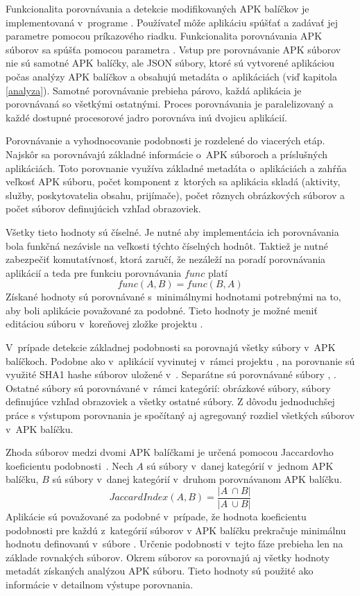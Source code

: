 Funkcionalita porovnávania a detekcie modifikovaných APK balíčkov je implementovaná v~programe . Používateľ môže aplikáciu spúšťať a zadávať jej parametre pomocou príkazového riadku. Funkcionalita porovnávania APK súborov sa spúšťa pomocou parametra . Vstup pre porovnávanie APK súborov nie sú samotné APK balíčky, ale JSON súbory, ktoré sú vytvorené aplikáciou  počas analýzy APK balíčkov a obsahujú metadáta o~aplikáciách (viď kapitola \ref{analyza}). Samotné porovnávanie prebieha párovo, každá aplikácia je porovnávaná so všetkými ostatnými. Proces porovnávania je paralelizovaný a každé dostupné procesorové jadro porovnáva inú dvojicu aplikácií. 

Porovnávanie a vyhodnocovanie podobnosti je rozdelené do viacerých etáp. Najskôr sa porovnávajú základné informácie o~APK súboroch a príslušných aplikáciách. Toto porovnanie využíva základné metadáta o~aplikáciách a zahŕňa veľkosť APK súboru, počet komponent z~ktorých sa aplikácia skladá (aktivity, služby, poskytovatelia obsahu, prijímače), počet rôznych obrázkových súborov a počet súborov definujúcich vzhľad obrazoviek.

Všetky tieto hodnoty sú číselné. Je nutné aby implementácia ich porovnávania bola funkčná nezávisle na veľkosti týchto číselných hodnôt. Taktiež je nutné zabezpečiť komutatívnosť, ktorá zaručí, že nezáleží na poradí porovnávania aplikácií a teda pre funkciu porovnávania $func$ platí \[func(A,B) = func(B,A)\] Získané hodnoty sú porovnávané s~minimálnymi hodnotami potrebnými na to, aby boli aplikácie považované za podobné. Tieto hodnoty je možné meniť editáciou súboru  v~koreňovej zložke projektu .

V~prípade detekcie základnej podobnosti sa porovnajú všetky súbory v~APK balíčkoch. Podobne ako v~aplikácií vyvinutej v~rámci projektu , na porovnanie sú využité SHA1 hashe súborov uložené v~. Separátne sú porovnávané súbory , . Ostatné súbory sú porovnávané v~rámci kategórií: obrázkové súbory, súbory definujúce vzhľad obrazoviek a všetky ostatné súbory. Z dôvodu jednoduchšej práce s výstupom porovnania je spočítaný aj agregovaný rozdiel všetkých súborov v~APK balíčku. 

Zhoda súborov medzi dvomi APK balíčkami je určená pomocou Jaccardovho koeficientu podobnosti~\cite{Phillips2013}. Nech $A$ sú súbory v~danej kategórií v~jednom APK balíčku, $B$ sú súbory v~danej kategórií v~druhom porovnávanom APK balíčku. \[Jaccard Index(A,B) = \frac{|A~\cap B|}{ |A~\cup B|}\] Aplikácie sú považované za podobné v~prípade, že hodnota koeficientu podobnosti pre každú z~kategórií súborov v APK balíčku prekračuje minimálnu hodnotu definovanú v~súbore . Určenie podobnosti v~tejto fáze prebieha len na základe rovnakých súborov. Okrem súborov sa porovnajú aj všetky hodnoty metadát získaných analýzou APK súboru. Tieto hodnoty sú použité ako informácie v detailnom výstupe porovnania.

